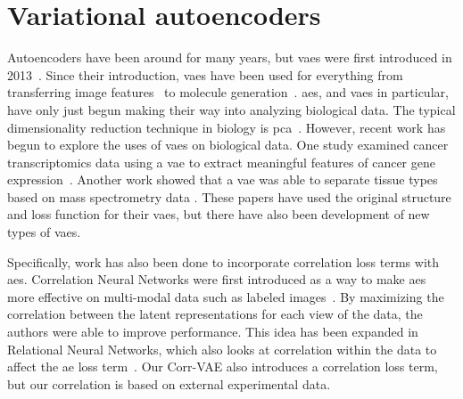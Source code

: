 
\section{Variational autoencoders}
Autoencoders have been around for many years, but \glspl{vae} were first introduced in 2013~\cite{kingma2013auto, rezende2014stochastic}.
Since their introduction, \glspl{vae} have been used for everything from transferring image features~\cite{larsen2015autoencoding} to molecule generation~\cite{gomez2016automatic}.
\glspl{ae}, and \glspl{vae} in particular, have only just begun making their way into analyzing biological data.
The typical dimensionality reduction technique in biology is \gls{pca}~\cite{ringner2008principal}.
However, recent work has begun to explore the uses of \glspl{vae} on biological data.
One study examined cancer transcriptomics data using a \gls{vae} to extract meaningful features of cancer gene expression~\cite{way2017extracting}.
Another work showed that a \gls{vae} was able to separate tissue types based on mass spectrometry data \cite{inglese2017variational}.
These papers have used the original structure and loss function for their \glspl{vae}, but there have also been development of new types of \glspl{vae}.

Specifically, work has also been done to incorporate correlation loss terms with \glspl{ae}.
Correlation Neural Networks were first introduced as a way to make \glspl{ae} more effective on multi-modal data such as labeled images~\cite{chandar2016correlational}.
By maximizing the correlation between the latent representations for each view of the data, the authors were able to improve performance.
This idea has been expanded in Relational Neural Networks, which also looks at correlation within the data to affect the \gls{ae} loss term~\cite{meng2017relational}.
Our Corr-VAE also introduces a correlation loss term, but our correlation is based on external experimental data.